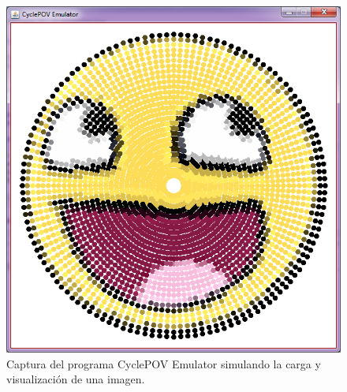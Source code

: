 \begin{figure}[!ht]
	\centering

	\includegraphics[width=\textwidth]{images/cyclePOVemulator}
	\caption{Captura del programa CyclePOV Emulator simulando la carga y
	visualización de una imagen.}
\end{figure}
